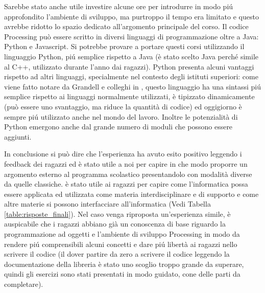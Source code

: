Sarebbe stato anche utile investire alcune ore per introdurre in modo piú approfondito l'ambiente di sviluppo, ma purtroppo il tempo era limitato e questo avrebbe ridotto lo spazio dedicato all'argomento principale del corso. Il codice Processing può essere scritto in diversi linguaggi di programmazione oltre a Java: Python e Javascript. Si potrebbe provare a portare questi corsi utilizzando il linguaggio Python, piú semplice rispetto a Java (è stato scelto Java perché simile al C++, utilizzato durante l'anno dai ragazzi). Python presenta alcuni vantaggi rispetto ad altri linguaggi, specialmente nel contesto degli istituti superiori: come viene fatto notare da Grandell e colleghi in \cite{python_high_school}, questo linguaggio ha una sintassi piú semplice rispetto ai linguaggi normalmente utilizzati, è tipizzato dinamicamente (può essere uno svantaggio, ma riduce la quantità di codice) ed oggigiorno è sempre piú utilizzato anche nel mondo del lavoro. Inoltre le potenzialità di Python emergono anche dal grande numero di moduli che possono essere aggiunti. 

In conclusione si può dire che l'esperienza ha avuto esito positivo leggendo i feedback dei ragazzi ed è stato utile a noi per capire in che modo proporre un argomento esterno al programma scolastico presentandolo con modalità diverse da quelle classiche. è stato utile ai ragazzi per capire come l'informatica possa essere applicata ed utilizzata come materia interdisciplinare e di supporto e come altre materie si possono interfacciare all'informatica (Vedi Tabella \ref{table:risposte_finali}). Nel caso venga riproposta un'esperienza simile, è auspicabile che i ragazzi abbiano già un conoscenza di base riguardo la programmazione ad oggetti e l'ambiente di sviluppo Processing in modo da rendere piú comprensibili alcuni concetti e dare piú libertà ai ragazzi nello scrivere il codice (il dover partire da zero a scrivere il codice leggendo la documentazione della libreria è stato uno scoglio troppo grande da superare, quindi gli esercizi sono stati presentati in modo guidato, cone delle parti da completare).



